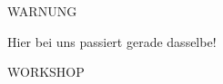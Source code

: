 \begin{frame}[fragile]{WARNUNG}

\begin{center}
{
\LARGE
Hier bei uns passiert gerade dasselbe!
}
\end{center}

\end{frame}


\begin{frame}[fragile]{}

\begin{center}
{
\LARGE
WORKSHOP}
\end{center}

\end{frame}


